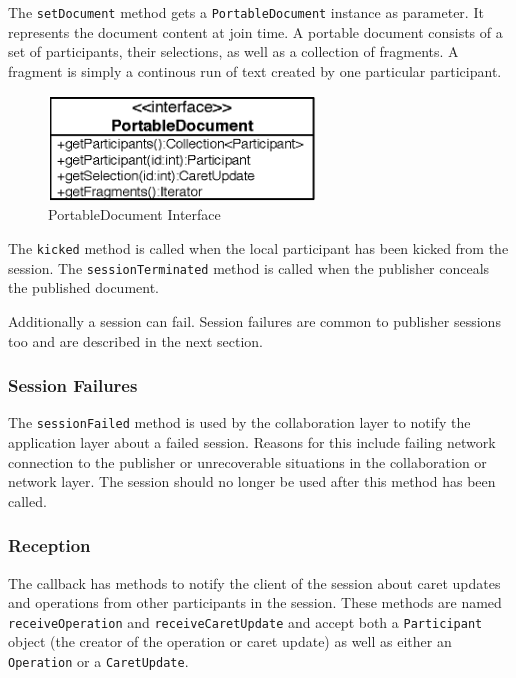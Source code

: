 The \texttt{set\-Document} method gets a \texttt{Portable\-Document} instance
as parameter. It represents the document content at join time. A portable
document consists of a set of participants, their selections, as well as
a collection of fragments. A fragment is simply a continous run of text
created by one particular participant.

\begin{figure}[H]
 \centering
 \includegraphics[width=7.09cm,height=2.79cm]{../images/finalreport/architecture_portabledocument_uml.eps}
 \caption{PortableDocument Interface}
\end{figure}

The \texttt{kicked} method is called when the local participant
has been kicked from the session. The \texttt{sessionTerminated}
method is called when the publisher conceals the published document. 

Additionally a session can fail. Session failures are common to publisher
sessions too and are described in the next section.


\subsubsection{Session Failures}
\label{sect:archoverview.sessionfailure}
The \texttt{sessionFailed}
method is used by the collaboration layer to notify the application layer
about a failed session. Reasons for this include failing network connection
to the publisher or unrecoverable situations in the collaboration or network
layer. The session should no longer be used after this method has been
called.


\subsubsection{Reception}
The callback has methods to notify the client of the session about caret
updates and operations from other participants in the session. These methods
are named \texttt{receive\-Operation} and \texttt{receive\-Caret\-Update}
and accept both a \texttt{Participant} object (the creator of the operation
or caret update)
as well as either an \texttt{Operation} or a \texttt{Caret\-Update}.


